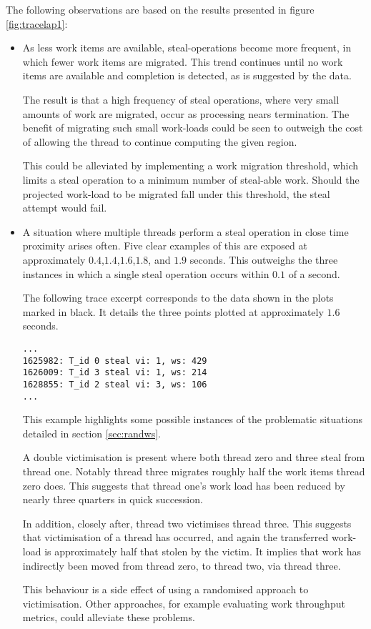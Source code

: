 

The following observations are based on the results presented in figure \ref{fig:tracelap1}:

\begin{itemize}
\item 
    As less work items are available, steal-operations become more frequent, in which fewer work items are migrated. 
    This trend continues until no work items are available and completion is detected, as is suggested by the data.

    The result is that a high frequency of steal operations, where very small amounts of work are
    migrated, occur as processing nears termination. The benefit of migrating such small work-loads could
    be seen to outweigh the cost of allowing the thread to continue computing the given region.
    
    This could be alleviated by implementing a work migration threshold, which limits a steal operation 
    to a minimum number of steal-able work. Should the projected work-load to be migrated fall under 
    this threshold, the steal attempt would fail. 

\item 
    A situation where multiple threads perform a steal operation in close time proximity arises often.
    Five clear examples of this are exposed at approximately \(0.4\),\(1.4\),\(1.6\),\(1.8\), and \(1.9\) seconds.
    This outweighs the three instances in which a single steal operation occurs within \(0.1\) of a second.

    The following trace excerpt corresponds to the data shown in the plots marked in black. 
    It details the three points plotted at approximately \(1.6\) seconds.

\begin{lstlisting}
...
1625982: T_id 0 steal vi: 1, ws: 429
1626009: T_id 3 steal vi: 1, ws: 214
1628855: T_id 2 steal vi: 3, ws: 106
...
\end{lstlisting}
    
    This example highlights some possible instances of the problematic situations detailed in section \ref{sec:randws}. 
    
    A double victimisation is present where both thread zero and three steal from thread one. Notably thread three 
    migrates roughly half the work items thread zero does. This suggests that thread one's work load has been reduced
    by nearly three quarters in quick succession.
    
    In addition, closely after, thread two victimises thread three. This suggests that victimisation of a thread has occurred,
    and again the transferred work-load is approximately half that stolen by the victim. It implies that work has indirectly 
    been moved from thread zero, to thread two, via thread three.
    
    This behaviour is a side effect of using a randomised approach to victimisation. Other approaches, for example evaluating work
    throughput metrics, could alleviate these problems.
\end{itemize}


